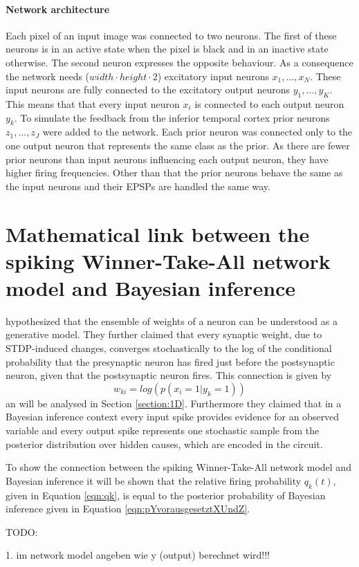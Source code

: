 \paragraph{Network architecture}
Each pixel of an input image was connected to two neurons. The first of these neurons is in an active state when the pixel is black and in an inactive state otherwise. The second neuron expresses the opposite behaviour. As a consequence the network needs ($width \cdot height \cdot 2$) excitatory input neurons $x_1,...,x_N$. These input neurons are fully connected to the excitatory output neurons $y_1,...,y_K$. This means that that every input neuron $x_i$ is connected to each output neuron $y_k$. 
To simulate the feedback from the inferior temporal cortex prior neurons $z_1,...,z_J$ were added to the network. Each prior neuron was connected only to the one  output neuron that represents the same class as the prior. As there are fewer prior neurons than input neurons influencing each output neuron, they have higher firing frequencies. Other than that the prior neurons behave the same as the input neurons and their EPSPs are handled the same way.

\section{Mathematical link between the spiking Winner-Take-All network model and Bayesian inference}
\label{linkNetworkBayes}

\citet{nessler} hypothesized that the ensemble of weights of a neuron can be understood as a generative model. They further claimed that every synaptic weight, due to STDP-induced changes,  converges stochastically to the log of the conditional probability that the presynaptic neuron has fired just before the postsynaptic neuron, given that the postsynaptic neuron fires. This connection is given by
\begin{equation}
 w_{ki} = log(p(x_i = 1 | y_k = 1))
\end{equation}
an will be analysed in Section \ref{section:1D}.
Furthermore they claimed that in a Bayesian inference context every input spike provides evidence for an observed variable and every output spike represents one stochastic sample from the posterior distribution over hidden causes, which are encoded in the circuit. 

To show the connection between the spiking Winner-Take-All network model and Bayesian inference it will be shown that the relative firing probability $q_k(t)$, given in Equation \ref{eqn:qk}, is equal to the posterior probability of Bayesian inference given in Equation \ref{eqn:pYvorausgesetztXUndZ}.







TODO:

1. im network model angeben wie y (output) berechnet wird!!!


